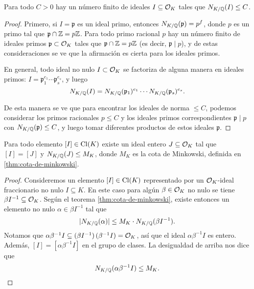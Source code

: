 \begin{lema}
  Para todo $C > 0$ hay un número finito de ideales $I \subseteq \mathcal{O}_K$ tales que
  $N_{K/\mathbb{Q}} (I) \le C$.

  \begin{proof}
    Primero, si $I = \mathfrak{p}$ es un ideal primo, entonces
    $N_{K/\mathbb{Q}} (\mathfrak{p}) = p^f$, donde $p$ es un primo tal que
    $\mathfrak{p}\cap\mathbb{Z} = p\mathbb{Z}$. Para todo primo racional $p$ hay un número
    finito de ideales primos $\mathfrak{p} \subset \mathcal{O}_K$ tales que
    $\mathfrak{p}\cap\mathbb{Z} = p\mathbb{Z}$ (es decir, $\mathfrak{p} \mid p$), y de estas
    consideraciones se ve que la afirmación es cierta para los ideales primos.

    En general, todo ideal no nulo $I \subset \mathcal{O}_K$ se factoriza de alguna
    manera en ideales primos:
    $I = \mathfrak{p}_1^{e_1}\cdots \mathfrak{p}_s^{e_s}$, y luego
    $$N_{K/\mathbb{Q}} (I) = N_{K/\mathbb{Q}} (\mathfrak{p}_1)^{e_1}\cdots N_{K/\mathbb{Q}} (\mathfrak{p}_s)^{e_s}.$$

    De esta manera se ve que para encontrar los ideales de norma $\le C$,
    podemos considerar los primos racionales $p \le C$ y los ideales primos
    correspondientes $\mathfrak{p} \mid p$ con $N_{K/\mathbb{Q}} (\mathfrak{p}) \le C$,
    y luego tomar diferentes productos de estos ideales $\mathfrak{p}$.
  \end{proof}
\end{lema}

\begin{lema}
  Para todo elemento $[I] \in \operatorname{Cl} (K)$ existe un ideal entero $J \subseteq \mathcal{O}_K$
  tal que $[I] = [J]$ y $N_{K/\mathbb{Q}} (J) \le M_K$, donde $M_K$ es la cota de
  Minkowski, definida en \ref{thm:cota-de-minkowski}.

  \begin{proof}
    Consideremos un elemento $[I] \in \operatorname{Cl} (K)$ representado por un $\mathcal{O}_K$-ideal
    fraccionario no nulo $I \subseteq K$. En este caso para algún
    $\beta \in \mathcal{O}_K$ no nulo se tiene $\beta I^{-1} \subseteq \mathcal{O}_K$.
    Según el teorema \ref{thm:cota-de-minkowski}, existe entonces un elemento no
    nulo $\alpha \in \beta I^{-1}$ tal que
    $$|N_{K/\mathbb{Q}} (\alpha)| \le M_K\cdot N_{K/\mathbb{Q}} (\beta I^{-1}).$$
    Notamos que
    $\alpha \beta^{-1} I \subseteq (\beta I^{-1})\,(\beta^{-1} I) = \mathcal{O}_K$, así
    que el ideal $\alpha \beta^{-1} I$ es entero. Además,
    $[I] = [\alpha \beta^{-1} I]$ en el grupo de clases. La desigualdad de
    arriba nos dice que
    \[ N_{K/\mathbb{Q}} (\alpha \beta^{-1} I) \le M_K. \qedhere \]
  \end{proof}
\end{lema}

